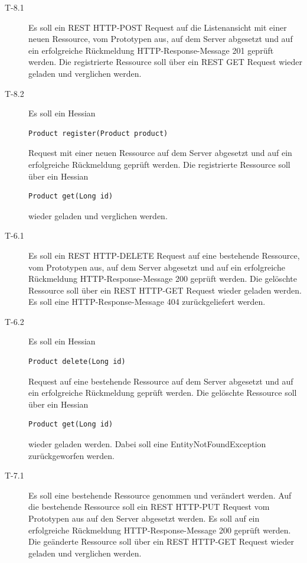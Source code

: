 \documentclass[abstracton, listof=totocnumbered,
bibliography=totocnumbered]{scrreprt}
\begin{document}
\begin{description}
    \item[T-8.1] Es soll ein \ac{REST} HTTP-POST Request auf die
    Listenansicht mit einer neuen Ressource, vom Prototypen aus,
    auf dem Server abgesetzt und auf ein erfolgreiche Rückmeldung
    HTTP-Response-Message 201 geprüft werden. Die registrierte Ressource soll
    über ein \ac{REST} GET Request wieder geladen und verglichen werden.
    \newline

    \item[T-8.2] Es soll ein Hessian 
    \begin{verbatim}Product register(Product product)\end{verbatim}
    Request mit einer neuen Ressource auf dem Server abgesetzt und auf ein
    erfolgreiche Rückmeldung geprüft werden. Die registrierte Ressource soll
    über ein Hessian \begin{verbatim}Product get(Long id)\end{verbatim} wieder
    geladen und verglichen werden.
    \newline
    
    \item[T-6.1] Es soll ein \ac{REST} HTTP-DELETE Request auf
    eine bestehende Ressource, vom Prototypen aus, auf dem Server abgesetzt und
    auf ein erfolgreiche Rückmeldung HTTP-Response-Message 200 geprüft werden.
    Die gelöschte Ressource soll über ein \ac{REST} HTTP-GET Request wieder
    geladen werden. Es soll eine HTTP-Response-Message 404 zurückgeliefert werden.
    \newline

    \item[T-6.2] Es soll ein Hessian 
    \begin{verbatim}Product delete(Long id)\end{verbatim}
    Request auf eine bestehende Ressource auf dem Server abgesetzt und auf ein
    erfolgreiche Rückmeldung geprüft werden. Die gelöschte Ressource
    soll über ein Hessian 
    \begin{verbatim}Product get(Long id)\end{verbatim} 
    wieder geladen werden. Dabei soll eine EntityNotFoundException
    zurückgeworfen werden.
    \newline
    
    \item[T-7.1] Es soll eine bestehende Ressource genommen und
    verändert werden. Auf die bestehende Ressource soll ein \ac{REST} HTTP-PUT
    Request vom Prototypen aus auf den Server abgesetzt werden. Es soll auf
    ein erfolgreiche Rückmeldung HTTP-Response-Message 200 geprüft werden. Die
    geänderte Ressource soll über ein \ac{REST} HTTP-GET Request wieder geladen
    und verglichen werden.
    \newpage
        

\end{description}
\end{document}
